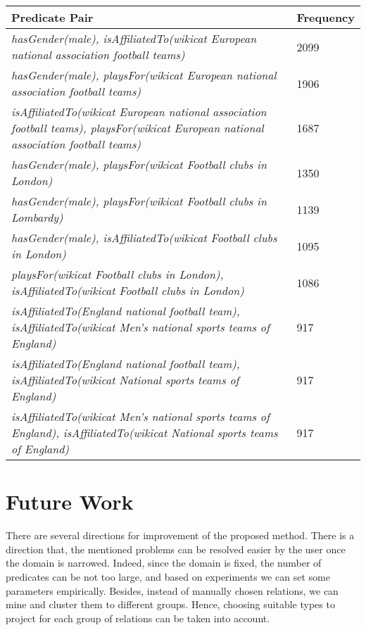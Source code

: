 \documentclass{acm_proc_article-sp}
\begin{document}
\begin{center}
\begin{tabular}{ |p{6cm}|p{1.5cm}| } 
\hline
Predicate Pair & Frequency\\
\hline
\textit{hasGender(male), isAffiliatedTo(wikicat European national association football teams)} & 2099 \\
\hline
\textit{hasGender(male), playsFor(wikicat European national association football teams)} & 1906 \\
\hline
\textit{isAffiliatedTo(wikicat European national association football teams), playsFor(wikicat European national association football teams)} & 1687 \\
\hline
\textit{hasGender(male), playsFor(wikicat Football clubs in London)} & 1350 \\
\hline
\textit{hasGender(male), playsFor(wikicat Football clubs in Lombardy)} & 1139 \\
\hline
\textit{hasGender(male), isAffiliatedTo(wikicat Football clubs in London)} & 1095 \\
\hline
\textit{playsFor(wikicat Football clubs in London), isAffiliatedTo(wikicat Football clubs in London)} & 1086 \\
\hline
\textit{isAffiliatedTo(England national football team), isAffiliatedTo(wikicat Men's national sports teams of England)} & 917 \\
\hline
\textit{isAffiliatedTo(England national football team), isAffiliatedTo(wikicat National sports teams of England)} & 917 \\
\hline
\textit{isAffiliatedTo(wikicat Men's national sports teams of England), isAffiliatedTo(wikicat National sports teams of England)} & 917 \\
\hline
\end{tabular}
\end{center}

\section{Future Work}
\label{section4}

There are several directions for improvement of the proposed method. There is a direction that, the mentioned problems can be resolved easier by the user once the domain is narrowed. Indeed, since the domain is fixed, the number of predicates can be not too large, and based on experiments we can set some parameters empirically. Besides, instead of manually chosen relations, we can mine and cluster them to different groups. Hence, choosing suitable types to project for each group of relations can be taken into account.
\end{document}
